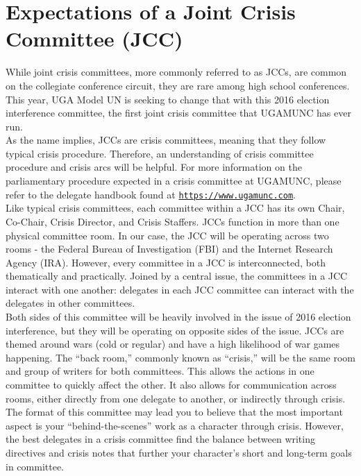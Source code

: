 \documentclass[10pt, letterpaper]{article}
\begin{document}
\newpage

\section{Expectations of a Joint Crisis Committee (JCC)}

While joint crisis committees, more commonly referred to as JCCs, are
common on the collegiate conference circuit, they are rare among high
school conferences. This year, UGA Model UN is seeking to change that
with this 2016 election interference committee, the first joint crisis
committee that UGAMUNC has ever run. \\

As the name implies, JCCs are crisis committees, meaning that they
follow typical crisis procedure. Therefore, an understanding of crisis
committee procedure and crisis arcs will be helpful. For more
information on the parliamentary procedure expected in a crisis
committee at UGAMUNC, please refer to the delegate handbook found at
\texttt{\href{https://www.ugamunc.com}{https://www.ugamunc.com}}. \\

Like typical crisis committees, each committee within a JCC has its own
Chair, Co-Chair, Crisis Director, and Crisis Staffers. JCCs function in
more than one physical committee room. In our case, the JCC will be
operating across two rooms - the Federal Bureau of Investigation (FBI)
and the Internet Research Agency (IRA). However, every committee in a
JCC is interconnected, both thematically and practically. Joined by a
central issue, the committees in a JCC interact with one another:
delegates in each JCC committee can interact with the delegates in other
committees. \\

Both sides of this committee will be heavily involved in the issue of
2016 election interference, but they will be operating on opposite sides
of the issue. JCCs are themed around wars (cold or regular) and have a
high likelihood of war games happening. The ``back room,'' commonly
known as ``crisis,'' will be the same room and group of writers for both
committees. This allows the actions in one committee to quickly affect
the other. It also allows for communication across rooms, either
directly from one delegate to another, or indirectly through crisis. \\

The format of this committee may lead you to believe that the most
important aspect is your ``behind-the-scenes'' work as a character
through crisis. However, the best delegates in a crisis committee find
the balance between writing directives and crisis notes that further
your character's short and long-term goals in committee. \\
\end{document}

